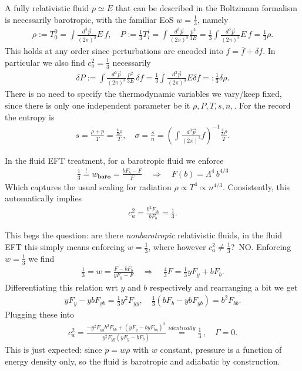 A fully relativistic fluid $p\simeq E$ that can be described in the Boltzmann formalism is necessarily barotropic, with the familiar EoS $w=\tfrac13$, namely
\begin{align}
    \rho:=T^0_0=\int\frac{d^3\vec{p}}{(2\pi)^3} E\, f, \quad P:= \tfrac13 T^i_i =\int\frac{d^3\vec{p}}{(2\pi)^3} \frac{p^2}{3E}= \frac13 \int\frac{d^3\vec{p}}{(2\pi)^3} E\, f = \tfrac13 \rho.
\end{align}
This holds at any order since perturbations are encoded into $f=\bar{f}+\delta f$.
In particular we also find $c_a^2=\tfrac13$ necessarily
\begin{align}
    \delta P:=\int\frac{d^3\vec{p}}{(2\pi)^3} \frac{p^2}{3E}\, \delta f = \frac13 \int\frac{d^3\vec{p}}{(2\pi)^3} E \delta f =: \tfrac13 \delta\rho.
\end{align}
There is no need to specify the thermodynamic variables we vary/keep fixed, since there is only one independent parameter be it $\rho,P,T,s,n,$.
For the record the entropy is
\begin{align}
    s=\frac{\rho+p}{T}= \frac{\tfrac43 \rho}{T}, \quad \sigma=\frac{s}{n}=\left(\int\frac{d^3\vec{p}}{(2\pi)^3} f\right)^{-1} \frac{\tfrac43 \rho}{T}.
\end{align}

In the fluid EFT treatment, for a barotropic fluid we enforce
\begin{align}
    \tfrac13 \overset{!}{=}w_{\textbf{baro}}=\frac{bF_b-F}{F}\quad \Rightarrow\quad F(b)=\Lambda^4\, b^{4/3}
\end{align}
Which captures the usual scaling for radiation $\rho\propto T^4 \propto n^{4/3}$.
Consistently, this automatically implies 
\begin{align}
    c_a^2=\frac{b^2F_{bb}}{bF_b}=\frac{1}{3}.
\end{align}

This begs the question:  are there \emph{nonbarotropic} relativistic fluids, in the fluid EFT this simply means enforcing $w=\tfrac13$, where however $c_a^2\neq\tfrac13$?\, NO.
Enforcing $w=\tfrac13$ we find
\begin{align}
    \tfrac13=w=\frac{F-bF_b}{yF_y-F} \quad \Rightarrow\quad \tfrac43 F=\tfrac13 yF_y+bF_b.
\end{align}
Differentiating this relation wrt $y$ and $b$ respectively and rearranging a bit we get
\begin{align}
    yF_y-ybF_{yb}=\tfrac13 y^2F_{yy}, \quad \tfrac13 (bF_b-ybF_{yb})=b^2F_{bb}.
\end{align}
Plugging these into
\begin{align}
    c_a^2=\frac{-y^2F_{yy}b^2F_{bb}+(yF_y-byF_{by})^2}{y^2F_{yy}(yF_y-bF_b)}\overset{identically}{=}\frac13\,, \quad \Gamma =0.
\end{align}
This is just expected: since $p=w\rho$ with $w$ constant, pressure is a function of energy density only, so the fluid is barotropic and adiabatic by construction.

